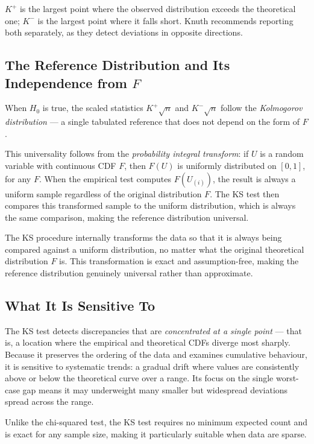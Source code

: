 $K^+$ is the largest point where the observed distribution exceeds the
theoretical one; $K^-$ is the largest point where it falls short.  Knuth
recommends reporting both separately, as they detect deviations in opposite
directions.
 
\subsection{The Reference Distribution and Its Independence from $F$}
 
When $H_0$ is true, the scaled statistics $K^+\sqrt{n}$ and $K^-\sqrt{n}$
follow the \emph{Kolmogorov distribution} --- a single tabulated reference
that does not depend on the form of $F$.
 
This universality follows from the \emph{probability integral transform}: if
$U$ is a random variable with continuous CDF $F$, then $F(U)$ is uniformly
distributed on $[0,1]$, for any $F$.  When the empirical test computes
$F(U_{(i)})$, the result is always a uniform sample regardless of the
original distribution $F$.  The KS test then compares this transformed
sample to the uniform distribution, which is always the same comparison,
making the reference distribution universal.
 
\begin{keyidea}
The KS procedure internally transforms the data so that it is always being
compared against a uniform distribution, no matter what the original
theoretical distribution $F$ is.  This transformation is exact and
assumption-free, making the reference distribution genuinely universal
rather than approximate.
\end{keyidea}
 
\subsection{What It Is Sensitive To}
 
The KS test detects discrepancies that are \emph{concentrated at a single
point} --- that is, a location where the empirical and theoretical CDFs
diverge most sharply.  Because it preserves the ordering of the data and
examines cumulative behaviour, it is sensitive to systematic trends: a
gradual drift where values are consistently above or below the theoretical
curve over a range.  Its focus on the single worst-case gap means it may
underweight many smaller but widespread deviations spread across the range.
 
Unlike the chi-squared test, the KS test requires no minimum expected count
and is exact for any sample size, making it particularly suitable when data
are sparse.
 
